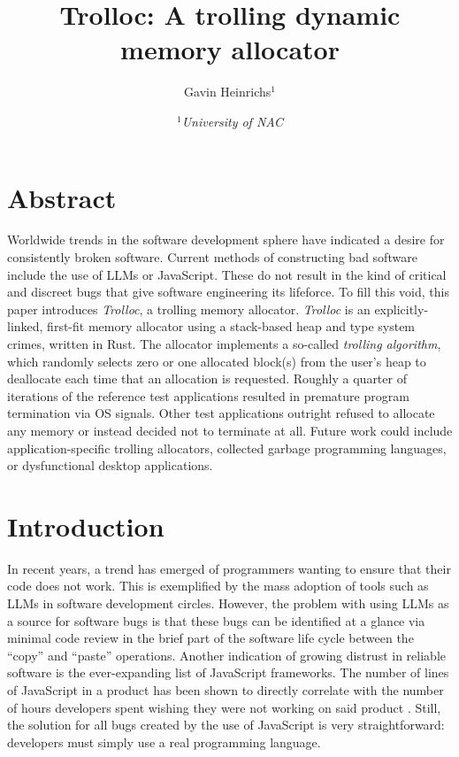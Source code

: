 \documentclass{article}
\title{Trolloc: A trolling dynamic memory allocator}
\author{Gavin Heinrichs$^1$}
\date{\small$^1$\textit{University of NAC}\normalsize}
\begin{document}
\maketitle

\section{Abstract}
Worldwide trends in the software development sphere have indicated a desire for consistently broken software. Current methods of constructing bad software include the use of LLMs or JavaScript. These do not result in the kind of critical and discreet bugs that give software engineering its lifeforce. To fill this void, this paper introduces \textit{Trolloc}, a trolling memory allocator. \textit{Trolloc} is an explicitly-linked, first-fit memory allocator using a stack-based heap and type system crimes, written in Rust. The allocator implements a so-called \textit{trolling algorithm}, which randomly selects zero or one allocated block(s) from the user's heap to deallocate each time that an allocation is requested. Roughly a quarter of iterations of the reference test applications resulted in premature program termination via OS signals. Other test applications outright refused to allocate any memory or instead decided not to terminate at all. Future work could include application-specific trolling allocators, collected garbage programming languages, or dysfunctional desktop applications.

\section{Introduction}
In recent years, a trend has emerged of programmers wanting to ensure that their code does not work. This is exemplified by the mass adoption of tools such as LLMs in software development circles. However, the problem with using LLMs as a source for software bugs is that these bugs can be identified at a glance via minimal code review in the brief part of the software life cycle between the ``copy'' and ``paste'' operations. Another indication of growing distrust in reliable software is the ever-expanding list of JavaScript frameworks. The number of lines of JavaScript in a product has been shown to directly correlate with the number of hours developers spent wishing they were not working on said product \cite{madeup}. Still, the solution for all bugs created by the use of JavaScript is very straightforward: developers must simply use a real programming language.
\end{document}
